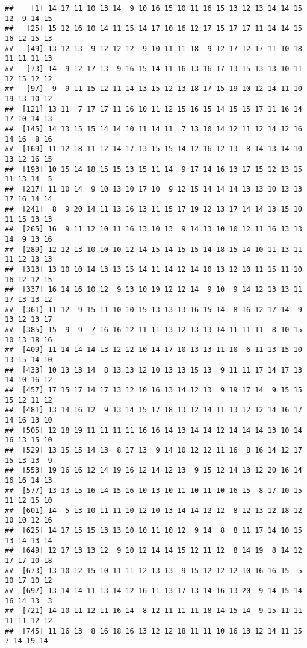 \documentclass[
]{article}
\begin{document}
\begin{verbatim}
##    [1] 14 17 11 10 13 14  9 10 16 15 10 11 16 15 13 12 13 14 14 15 12  9 14 15
##   [25] 15 12 16 10 14 11 15 14 17 10 16 12 17 15 17 17 11 14 14 15 16 12 15 13
##   [49] 13 12 13  9 12 12 12  9 10 11 11 18  9 12 17 12 17 11 10 18 11 11 11 13
##   [73] 14  9 12 17 13  9 16 15 14 11 16 13 16 17 13 15 13 13 10 11 12 15 12 12
##   [97]  9  9 11 15 12 11 14 13 15 12 13 18 17 15 19 10 12 14 11 10 19 13 10 12
##  [121] 13 11  7 17 17 11 16 10 11 12 15 16 15 14 15 15 17 11 16 14 17 10 14 13
##  [145] 14 13 15 15 14 14 10 11 14 11  7 13 10 14 12 11 12 14 12 16 14 16  8 16
##  [169] 11 12 18 11 12 14 17 13 15 15 14 12 16 12 13  8 14 13 14 10 13 12 16 15
##  [193] 10 15 14 18 15 15 13 15 11 14  9 17 14 16 13 17 15 12 13 15 11 13 14  5
##  [217] 11 10 14  9 10 13 10 17 10  9 12 15 14 14 14 13 13 10 13 13 17 16 14 14
##  [241]  8  9 20 14 11 13 16 13 11 15 17 19 12 13 17 14 14 13 15 10 11 15 13 13
##  [265] 16  9 11 12 10 11 16 13 10 13  9 14 13 10 10 12 11 16 13 13 14  9 13 16
##  [289] 12 12 13 10 10 10 12 14 15 14 15 15 14 18 15 14 10 11 13 11 11 12 13 13
##  [313] 13 10 10 14 13 13 15 14 11 14 12 14 10 13 12 10 11 15 11 10 16 12 12 15
##  [337] 16 14 16 10 12  9 13 10 19 12 12 14  9 10  9 14 12 13 13 11 17 13 13 12
##  [361] 11 12  9 15 11 10 10 15 13 13 13 16 15 14  8 16 12 17 14  9 13 12 13 17
##  [385] 15  9  9  7 16 16 12 11 11 13 12 13 13 14 11 11 11  8 10 15 10 13 18 16
##  [409] 11 14 14 14 13 12 12 10 14 17 10 13 13 11 10  6 11 13 15 10 13 15 14 10
##  [433] 10 13 13 14  8 13 13 12 10 13 13 15 13  9 11 11 17 14 17 13 14 10 16 12
##  [457] 17 15 17 14 17 13 12 10 16 13 14 12 13  9 19 17 14  9 15 15 15 12 11 12
##  [481] 13 14 16 12  9 13 14 15 17 18 13 12 14 11 13 12 12 14 16 17 14 16 13 10
##  [505] 12 18 19 11 11 11 11 16 16 14 13 14 14 12 14 14 14 13 10 14 16 13 15 10
##  [529] 13 15 15 14 13  8 17 13  9 14 10 12 12 11 16  8 16 14 12 17 15 13 13  9
##  [553] 19 16 16 12 14 19 16 12 14 12 13  9 15 12 14 13 12 20 16 14 16 16 14 13
##  [577] 13 13 15 16 14 15 16 10 13 10 11 10 11 10 16 15  8 17 10 15 11 12 15 10
##  [601] 14  5 13 10 11 11 10 12 10 13 14 14 12 12  8 12 13 12 18 12 10 10 12 16
##  [625] 14 17 15 15 13 13 10 10 11 10 12  9 14  8  8 11 17 14 10 15 13 14 13 14
##  [649] 12 17 13 13 12  9 10 12 14 14 15 12 11 12  8 14 19  8 14 12 17 17 10 18
##  [673] 13 10 12 15 10 11 11 12 13 13  9 15 12 12 12 10 16 16 15  5 10 17 10 12
##  [697] 13 14 14 11 13 14 12 16 11 13 17 13 14 16 13 20  9 14 15 14 16 14 13  3
##  [721] 14 10 11 12 11 16 14  8 12 11 11 11 18 14 15 14  9 15 11 11 11 11 12 12
##  [745] 11 16 13  8 16 18 16 13 12 12 18 11 11 10 16 13 12 14 11 15  7 14 19 14

\end{verbatim}
\end{document}
